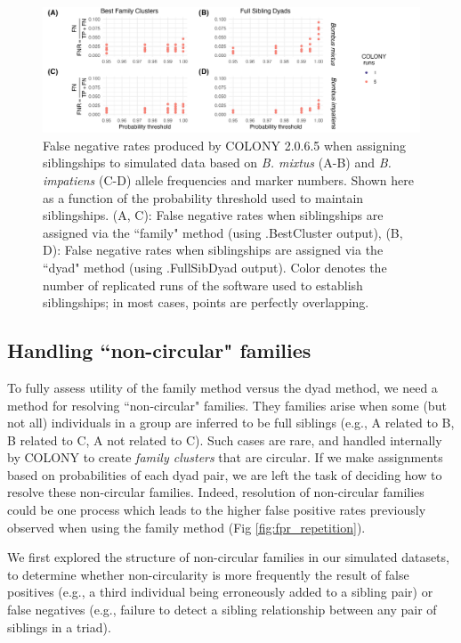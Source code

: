 \documentclass[12pt]{article}
\begin{document}
\begin{figure}[H]
    \centering
    \includegraphics[width=\linewidth]{appendix_figures/fnr_repetition.jpg}
    \caption{False negative rates produced by COLONY 2.0.6.5 when assigning siblingships to simulated data based on \emph{B. mixtus} (A-B) and \emph{B. impatiens} (C-D) allele frequencies and marker numbers. Shown here as a function of the probability threshold used to maintain siblingships. (A, C): False negative rates when siblingships are assigned via the ``family" method (using .BestCluster output), (B, D): False negative rates when siblingships are assigned via the ``dyad" method (using .FullSibDyad output). Color denotes the number of replicated runs of the software used to establish siblingships; in most cases, points are perfectly overlapping.}
    \label{fig:fnr_repetition}
\end{figure}


\subsection{Handling ``non-circular" families}

To fully assess utility of the family method versus the dyad method, we need a method for resolving ``non-circular" families. They families arise when some (but not all) individuals in a group are inferred to be full siblings (e.g., A related to B, B related to C, A not related to C). Such cases are rare, and handled internally by COLONY to create \emph{family clusters} that are circular. If we make assignments based on probabilities of each dyad pair, we are left the task of deciding how to resolve these non-circular families. Indeed, resolution of non-circular families could be one process which leads to the higher false positive rates previously observed when using the family method (Fig \ref{fig:fpr_repetition}).

We first explored the structure of non-circular families in our simulated datasets, to determine whether non-circularity is more frequently the result of false positives (e.g., a third individual being erroneously added to a sibling pair) or false negatives (e.g., failure to detect a sibling relationship between any pair of siblings in a triad).
\end{document}

